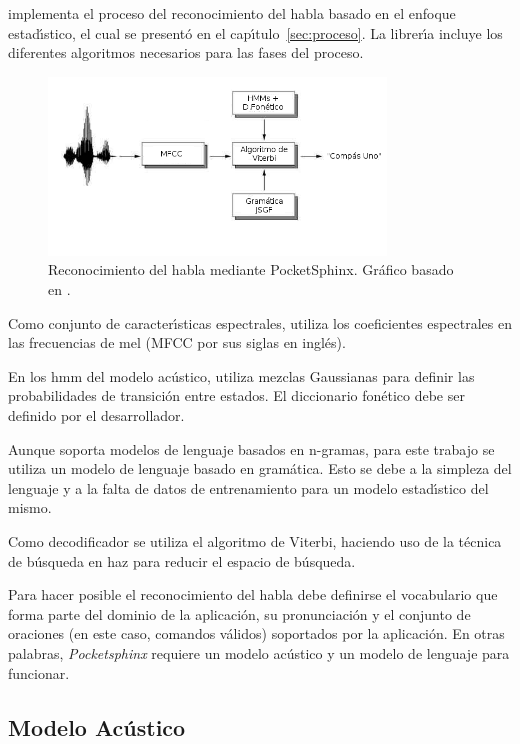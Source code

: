  implementa el proceso del reconocimiento del habla basado en el enfoque 
estad{\'\i}stico, el cual se present\'o en el cap{\'\i}tulo~\ref{sec:proceso}. La librer{\'\i}a incluye
los diferentes algoritmos necesarios para las fases del proceso.

\begin{figure}[H] 
\centering
\includegraphics[width=0.8\textwidth]{./graphics/pocketsphinx.png}
\caption{Reconocimiento del habla mediante PocketSphinx. Gr\'afico basado en \cite{VerenichASR}.}
\label{figure:proceso-pocketsphinx}
\end{figure}

Como conjunto de caracter{\'\i}sticas espectrales,  utiliza los coeficientes
espectrales en las frecuencias de mel (MFCC por sus siglas en ingl\'es).

En los \gls{hmm} del modelo ac\'ustico, utiliza mezclas Gaussianas para definir las probabilidades de 
transici\'on entre estados. El diccionario fon\'etico debe ser definido por el desarrollador.

Aunque  soporta modelos de lenguaje basados en n-gramas, para este trabajo 
se utiliza un modelo de lenguaje basado en gram\'atica. Esto se debe a la simpleza del lenguaje y a la 
falta de datos de entrenamiento para un modelo estad{\'\i}stico del mismo.

Como decodificador se utiliza el algoritmo de Viterbi, haciendo uso de la t\'ecnica de b\'usqueda en haz
para reducir el espacio de b\'usqueda.

Para hacer posible el reconocimiento del habla debe definirse el vocabulario que forma parte del 
dominio de la aplicaci\'on, su pronunciaci\'on y el conjunto de oraciones (en este caso, comandos 
v\'alidos) soportados por la aplicaci\'on. En otras palabras, \emph{Pocketsphinx} requiere un
modelo ac\'ustico y un modelo de lenguaje para funcionar.

\subsection{Modelo Ac\'ustico}
\label{sec:acustico-solucion}

